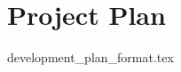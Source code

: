 \documentclass{article}
\begin{document}

\section*{Project Plan}
{development_plan_format.tex}



\end{document}
